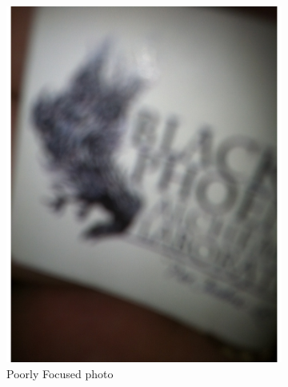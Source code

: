 \documentclass[sigconf]{acmart}
\begin{document}
\begin{figure}[hbp]
\begin{subfigure}[b]{0.3\columnwidth}
                \includegraphics[scale=0.25]{images/poor_f.pdf}
                \caption{Poorly Focused photo}
                \label{fig:pf}
        \end{subfigure}%
        \begin{subfigure}[b]{0.3\columnwidth}

\end{subfigure}
\end{figure}
\end{document}
